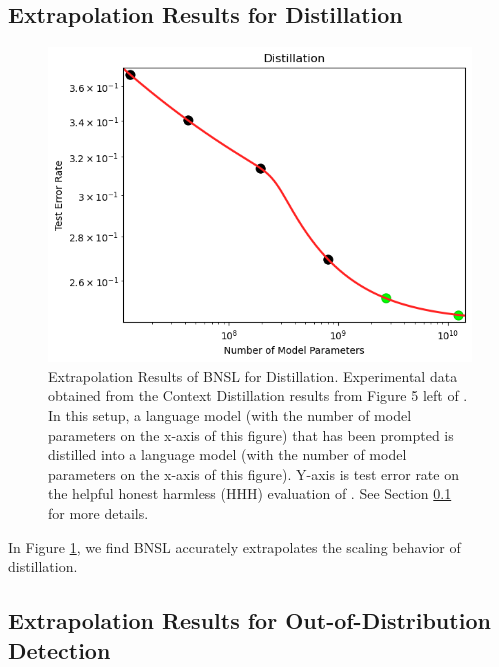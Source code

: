 \documentclass{article} %
\begin{document}
\clearpage

\subsection{Extrapolation Results for Distillation}
\label{section:distillation}

\begin{figure}[htbp]
    \centering
\includegraphics[width=1.0\textwidth]{figures/distillation/distillation.png}
    \caption{
Extrapolation Results of BNSL for Distillation. Experimental data obtained from the Context Distillation results from Figure 5 left of \cite{bai2022training}. In this setup, a language model (with the number of model parameters on the x-axis of this figure) that has been prompted is distilled into a language model (with the number of model parameters on the x-axis of this figure). Y-axis is test error rate on the helpful honest harmless (HHH) evaluation of \cite{askell2021general}. See Section \ref{section:distillation} for more details.
    }
    \label{fig:distillation}
\end{figure}

In Figure \ref{fig:distillation}, we find BNSL accurately extrapolates the scaling behavior of distillation.

\clearpage

\subsection{Extrapolation Results for Out-of-Distribution Detection}
\label{section:ood_detection}
\end{document}
